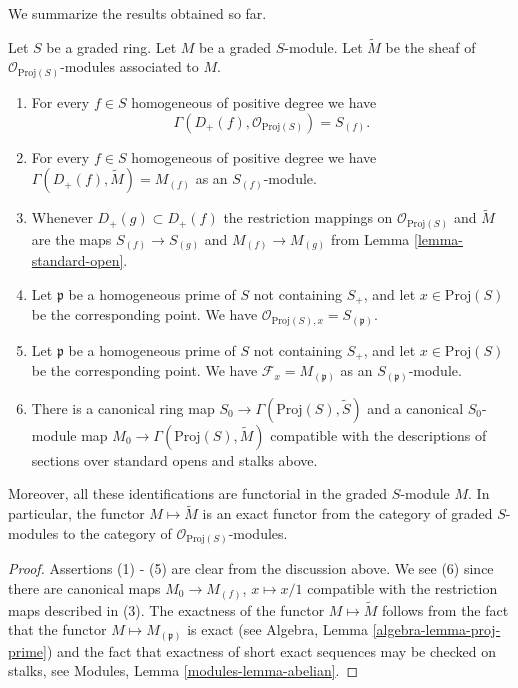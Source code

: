 \noindent
We summarize the results obtained so far.

\begin{lemma}
\label{lemma-proj-sheaves}
Let $S$ be a graded ring. Let $M$ be a graded $S$-module.
Let $\widetilde M$ be the sheaf of $\mathcal{O}_{\text{Proj}(S)}$-modules
associated to $M$.
\begin{enumerate}
\item For every $f \in S$ homogeneous of positive degree we have
$$
\Gamma(D_{+}(f), \mathcal{O}_{\text{Proj}(S)}) = S_{(f)}.
$$
\item For every $f\in S$ homogeneous of positive degree
we have $\Gamma(D_{+}(f), \widetilde M) = M_{(f)}$
as an $S_{(f)}$-module.
\item Whenever $D_{+}(g) \subset D_{+}(f)$ the restriction mappings
on $\mathcal{O}_{\text{Proj}(S)}$ and $\widetilde M$
are the maps
$S_{(f)} \to S_{(g)}$ and $M_{(f)} \to M_{(g)}$ from Lemma
\ref{lemma-standard-open}.
\item Let $\mathfrak p$ be a homogeneous prime of $S$ not containing
$S_{+}$, and let $x \in \text{Proj}(S)$
be the corresponding point. We have
$\mathcal{O}_{\text{Proj}(S), x} = S_{(\mathfrak p)}$.
\item Let $\mathfrak p$ be a homogeneous prime of $S$ not containing
$S_{+}$, and let $x \in \text{Proj}(S)$
be the corresponding point. We have $\mathcal{F}_x = M_{(\mathfrak p)}$
as an $S_{(\mathfrak p)}$-module.
\item
\label{item-map}
There is a canonical ring map
$
S_0 \longrightarrow \Gamma(\text{Proj}(S), \widetilde S)
$
and a canonical $S_0$-module map
$
M_0 \longrightarrow \Gamma(\text{Proj}(S), \widetilde M)
$
compatible with the descriptions of sections over standard opens
and stalks above.
\end{enumerate}
Moreover, all these identifications are functorial in the graded
$S$-module $M$. In particular, the functor $M \mapsto \widetilde M$
is an exact functor from the category of graded $S$-modules
to the category of $\mathcal{O}_{\text{Proj}(S)}$-modules.
\end{lemma}

\begin{proof}
Assertions (1) - (5) are clear from the discussion above.
We see (6) since there are canonical maps $M_0 \to M_{(f)}$,
$x \mapsto x/1$ compatible with the restriction maps
described in (3). The exactness of the functor $M \mapsto \widetilde M$
follows from the fact that the functor $M \mapsto M_{(\mathfrak p)}$
is exact (see Algebra, Lemma \ref{algebra-lemma-proj-prime})
and the fact that exactness of short exact sequences
may be checked on stalks, see
Modules, Lemma \ref{modules-lemma-abelian}.
\end{proof}

